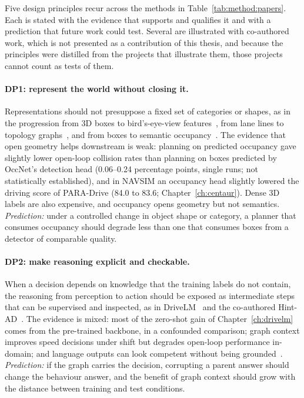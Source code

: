 Five design principles recur across the methods in Table~\ref{tab:method:papers}. Each is stated with the evidence that supports and qualifies it and with a prediction that future work could test. Several are illustrated with co-authored work, which is not presented as a contribution of this thesis, and because the principles were distilled from the projects that illustrate them, those projects cannot count as tests of them.

\paragraph{DP1: represent the world without closing it.} Representations should not presuppose a fixed set of categories or shapes, as in the progression from 3D boxes to bird's-eye-view features~\cite{li2022bevformer}, from lane lines to topology graphs~\cite{wang2023openlanev2}, and from boxes to semantic occupancy~\cite{sima2023occnet}. The evidence that open geometry helps downstream is weak: planning on predicted occupancy gave slightly lower open-loop collision rates than planning on boxes predicted by OccNet's detection head (0.06--0.24 percentage points, single runs; not statistically established), and in NAVSIM an occupancy head slightly lowered the driving score of PARA-Drive (84.0 to 83.6; Chapter~\ref{ch:centaur}). Dense 3D labels are also expensive, and occupancy opens geometry but not semantics. \emph{Prediction:} under a controlled change in object shape or category, a planner that consumes occupancy should degrade less than one that consumes boxes from a detector of comparable quality.

\paragraph{DP2: make reasoning explicit and checkable.} When a decision depends on knowledge that the training labels do not contain, the reasoning from perception to action should be exposed as intermediate steps that can be supervised and inspected, as in DriveLM~\cite{sima2024drivelm} and the co-authored Hint-AD~\cite{ding2024hint}. The evidence is mixed: most of the zero-shot gain of Chapter~\ref{ch:drivelm} comes from the pre-trained backbone, in a confounded comparison; graph context improves speed decisions under shift but degrades open-loop performance in-domain; and language outputs can look competent without being grounded~\cite{xie2025vlms}. \emph{Prediction:} if the graph carries the decision, corrupting a parent answer should change the behaviour answer, and the benefit of graph context should grow with the distance between training and test conditions.


